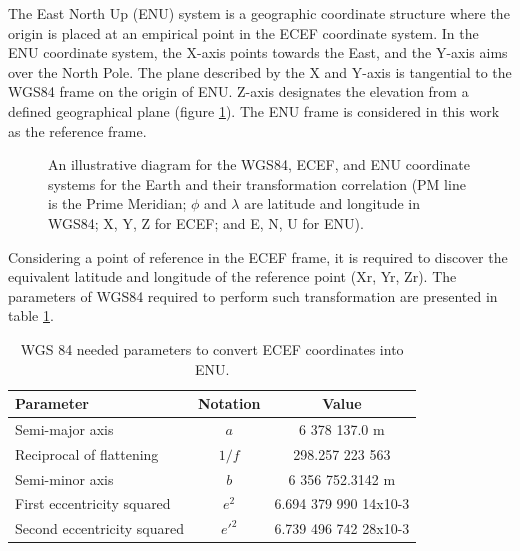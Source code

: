 The East North Up (ENU) system is a geographic coordinate structure where the origin is placed at an empirical point in the ECEF coordinate system.  In the ENU coordinate system, the X-axis points towards the East, and the Y-axis aims over the North Pole. The plane described by the X and Y-axis is tangential to the WGS84 frame on the origin of ENU. Z-axis designates the elevation from a defined geographical plane (figure \ref{fig:ECEF}). The ENU frame is considered in this work as the reference frame.

\begin{figure}[H]
    \centering
    \resizebox{0.70\linewidth}{!}{}
    \caption{An illustrative diagram for the WGS84, ECEF, and ENU coordinate systems for the Earth and their transformation correlation (PM line is the Prime Meridian; $\phi$ and $\lambda$ are latitude and longitude in WGS84; X, Y, Z for ECEF; and E, N, U for ENU).  }
    \label{fig:ECEF}
\end{figure}

Considering a point of reference in the ECEF frame, it is required to discover the equivalent latitude and longitude of the reference point (Xr, Yr, Zr). The parameters of WGS84 required to perform such transformation are presented in table \ref{tab:WGS}.

\begin{table}[H]
    \begin{center}
        \begin{tabular}[t]{lcc}
            \hline
            Parameter                   & Notation & Value                 \\
            \hline
            Semi-major axis             & $a$      & 6 378 137.0 m
            \\
            Reciprocal of flattening    & $1/f$    & 298.257 223 563
            \\
            Semi-minor axis             & $b$      & 6 356 752.3142 m      \\
            First eccentricity squared  & $e^2$    & 6.694 379 990 14x10-3 \\
            Second eccentricity squared & $e'^{2}$ & 6.739 496 742 28x10-3 \\
            \hline
        \end{tabular}
        \caption{WGS 84 needed parameters to convert ECEF coordinates into ENU. }
        \label{tab:WGS}
    \end{center}
\end{table}

